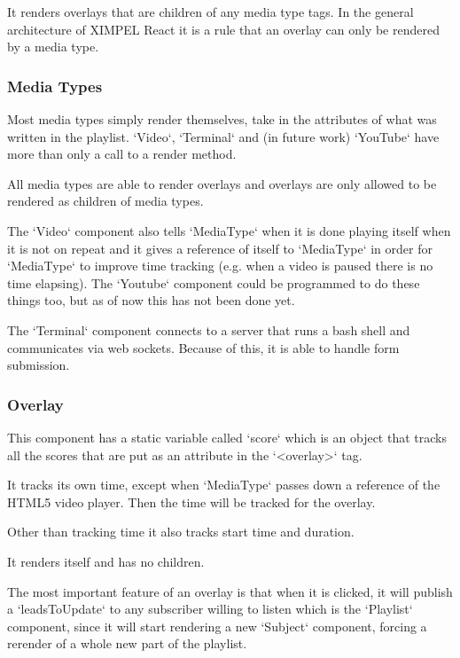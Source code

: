 It renders overlays that are children of any media type tags. In the general architecture of XIMPEL React it is a rule that an overlay can only be rendered by a media type.

\subsubsection{Media Types}
Most media types simply render themselves, take in the attributes of what was written in the playlist. `Video`, `Terminal` and (in future work) `YouTube` have more than only a call to a render method.

All media types are able to render overlays and overlays are only allowed to be rendered as children of media types.

The `Video` component also tells `MediaType` when it is done playing itself when it is not on repeat and it gives a reference of itself to `MediaType` in order for `MediaType` to improve time tracking (e.g. when a video is paused there is no time elapsing). The `Youtube` component could be programmed to do these things too, but as of now this has not been done yet.

The `Terminal` component connects to a server that runs a bash shell and communicates via web sockets. Because of this, it is able to handle form submission.

\subsubsection{Overlay}
This component has a static variable called `score` which is an object that tracks all the scores that are put as an attribute in the `<overlay>` tag. 

It tracks its own time, except when `MediaType` passes down a reference of the HTML5 video player. Then the time will be tracked for the overlay.

Other than tracking time it also tracks start time and duration.

It renders itself and has no children.

The most important feature of an overlay is that when it is clicked, it will publish a `leadsToUpdate` to any subscriber willing to listen which is the `Playlist` component, since it will start rendering a new `Subject` component, forcing a rerender of a whole new part of the playlist.

